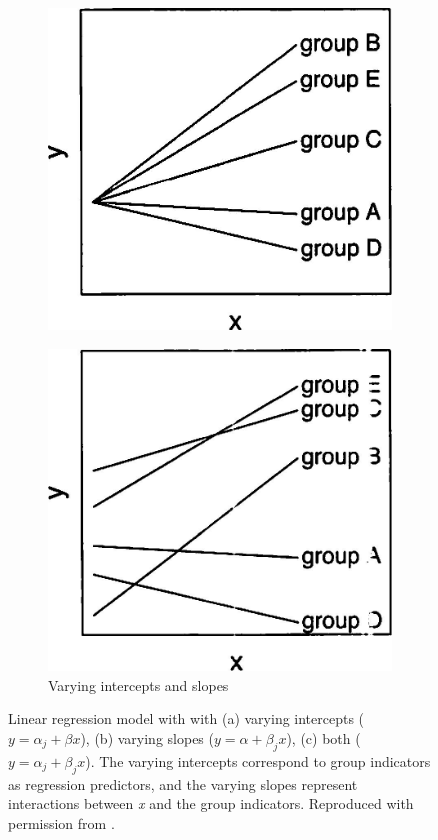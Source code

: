 \begin{figure}[h]
\begin{subfigure}[b]{.3\textwidth}
    \includegraphics[width=\textwidth]{Figures/GelmanMLMb.jpg}    
  \end{subfigure}
\hfill
  \begin{subfigure}[b]{.3\textwidth}
    \centering
    \caption{Varying intercepts and slopes}
    \includegraphics[width=\textwidth]{Figures/GelmanMLMc.jpg}    
  \end{subfigure}
  \hfill

  \caption{Linear regression model with with (a) varying intercepts ($y=\alpha_j + \beta x$), (b) varying slopes ($y=\alpha + \beta_j x$), (c) both ($y=\alpha_j + \beta_j x$). The varying intercepts correspond to group indicators as regression predictors, and the varying slopes represent interactions between \emph{x} and the group indicators. Reproduced with permission from \citet[Fig. 11.1]{DataAnalysisUsingGelman}. \label{fig:GelmanMLM}}
\end{figure}

